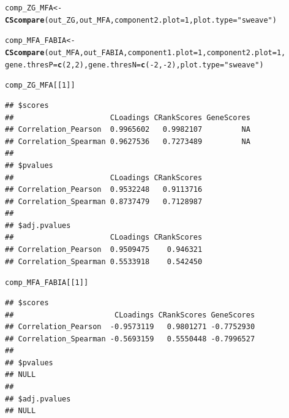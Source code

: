 \documentclass[a4paper]{article}\usepackage[]{graphicx}\usepackage[]{color}
\makeatletter
\newcommand{\hlnum}[1]{\textcolor[rgb]{0.686,0.059,0.569}{#1}}%
\newcommand{\hlstr}[1]{\textcolor[rgb]{0.192,0.494,0.8}{#1}}%
\newcommand{\hlopt}[1]{\textcolor[rgb]{0,0,0}{#1}}%
\newcommand{\hlstd}[1]{\textcolor[rgb]{0.345,0.345,0.345}{#1}}%
\newcommand{\hlkwb}[1]{\textcolor[rgb]{0.69,0.353,0.396}{#1}}%
\newcommand{\hlkwc}[1]{\textcolor[rgb]{0.333,0.667,0.333}{#1}}%
\newcommand{\hlkwd}[1]{\textcolor[rgb]{0.737,0.353,0.396}{\textbf{#1}}}%
\newenvironment{kframe}{%
 \def\at@end@of@kframe{}%
 \ifinner\ifhmode%
  \def\at@end@of@kframe{\end{minipage}}%
  \begin{minipage}{\columnwidth}%
 \fi\fi%
 \def\FrameCommand##1{\hskip\@totalleftmargin \hskip-\fboxsep
 \colorbox{shadecolor}{##1}\hskip-\fboxsep
     \hskip-\linewidth \hskip-\@totalleftmargin \hskip\columnwidth}%
 \MakeFramed {\advance\hsize-\width
   \@totalleftmargin\z@ \linewidth\hsize
   \@setminipage}}%
 {\par\unskip\endMakeFramed%
 \at@end@of@kframe}
\newenvironment{knitrout}{}{} %
\makeatother
\begin{document}
\begin{knitrout}
\color{fgcolor}\begin{kframe}
\begin{alltt}
        \hlstd{comp_ZG_MFA} \hlkwb{<-} \hlkwd{CScompare}\hlstd{(out_ZG,out_MFA,}\hlkwc{component2.plot}\hlstd{=}\hlnum{1}\hlstd{,}\hlkwc{plot.type}\hlstd{=}\hlstr{"sweave"}\hlstd{)}

        \hlstd{comp_MFA_FABIA} \hlkwb{<-} \hlkwd{CScompare}\hlstd{(out_MFA,out_FABIA,}\hlkwc{component1.plot}\hlstd{=}\hlnum{1}\hlstd{,}\hlkwc{component2.plot}\hlstd{=}\hlnum{1}\hlstd{,}
                        \hlkwc{gene.thresP}\hlstd{=}\hlkwd{c}\hlstd{(}\hlnum{2}\hlstd{,}\hlnum{2}\hlstd{),}\hlkwc{gene.thresN}\hlstd{=}\hlkwd{c}\hlstd{(}\hlopt{-}\hlnum{2}\hlstd{,}\hlopt{-}\hlnum{2}\hlstd{),}\hlkwc{plot.type}\hlstd{=}\hlstr{"sweave"}\hlstd{)}

        \hlstd{comp_ZG_MFA[[}\hlnum{1}\hlstd{]]}
\end{alltt}
\begin{verbatim}
## $scores
##                      CLoadings CRankScores GeneScores
## Correlation_Pearson  0.9965602   0.9982107         NA
## Correlation_Spearman 0.9627536   0.7273489         NA
## 
## $pvalues
##                      CLoadings CRankScores
## Correlation_Pearson  0.9532248   0.9113716
## Correlation_Spearman 0.8737479   0.7128987
## 
## $adj.pvalues
##                      CLoadings CRankScores
## Correlation_Pearson  0.9509475    0.946321
## Correlation_Spearman 0.5533918    0.542450
\end{verbatim}
\begin{alltt}
        \hlstd{comp_MFA_FABIA[[}\hlnum{1}\hlstd{]]}
\end{alltt}
\begin{verbatim}
## $scores
##                       CLoadings CRankScores GeneScores
## Correlation_Pearson  -0.9573119   0.9801271 -0.7752930
## Correlation_Spearman -0.5693159   0.5550448 -0.7996527
## 
## $pvalues
## NULL
## 
## $adj.pvalues
## NULL
\end{verbatim}
\end{kframe}\begin{figure}[H]


\end{figure}
\end{knitrout}
\end{document}
